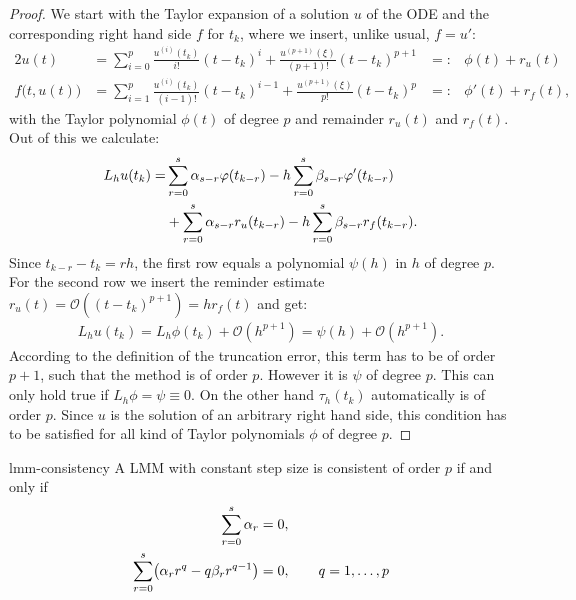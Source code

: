 \begin{proof}
  We start with the Taylor expansion of a solution $u$ of the ODE and
  the corresponding right hand side $f$ for $t_k$, where we insert,
  unlike usual, $f=u'$:
  \begin{alignat*}2
    u(t) &= \sum_{i=0}^p \frac{u^{(i)}(t_k)}{i!}(t-t_k)^i +
    \frac{u^{(p+1)}(\xi)}{(p+1)!}(t-t_k)^{p+1} &=:& \phi(t) + r_u(t)
    \\
    f\bigl(t,u(t)\bigr) &= \sum_{i=1}^p \frac{u^{(i)}(t_k)}{(i-1)!}(t-t_k)^{i-1} +
    \frac{u^{(p+1)}(\xi)}{p!}(t-t_k)^{p} &=:& \phi'(t) + r_f(t),
  \end{alignat*}
  with the Taylor polynomial $\phi(t)$ of degree $p$ and remainder
  $r_u(t)$ and $r_f(t)$. Out of this we calculate:
  \begin{align*}
    L_h u(t_k) =& \sum_{r=0}^s \alpha_{s-r} \varphi(t_{k-r}) - h
    \sum_{r=0}^s \beta_{s-r} \varphi'(t_{k-r})
    \\
    &+ \sum_{r=0}^s \alpha_{s-r} r_u(t_{k-r}) - h
    \sum_{r=0}^s \beta_{s-r} r_f(t_{k-r}).
  \end{align*}
  Since $t_{k-r}-t_k = r h$, the first row equals a polynomial 
  $\psi(h)$ in $h$ of degree $p$. For the second row we insert the
	reminder estimate $r_u(t) = \mathcal O((t-t_k)^{p+1}) = h
  r_f(t)$ and get:
  \begin{gather}
    \label{eq:lmm:15}
    L_h u(t_k) = L_h \phi(t_k) + \mathcal O(h^{p+1}) = \psi(h) + \mathcal O(h^{p+1}).
  \end{gather}
  According to the definition of the truncation error, this term has to be of
	order $p+1$, such that the method is of order $p$. However it is $\psi$
  of degree $p$. This can only hold true if $L_h\phi=\psi\equiv
  0$. On the other hand $\tau_h(t_k)$ automatically is of order
  $p$. Since $u$ is the solution of an arbitrary right hand side, this
	condition has to be satisfied for all kind of Taylor polynomials $\phi$ 
	of degree $p$.
\end{proof}

\begin{Theorem}{lmm-consistency}
  A LMM with constant step size is consistent of order
  $p$ if and only if
    \begin{gather}
      \label{eq:lmm:12}
      \begin{split}
      \sum_{r=0}^s \alpha_{r} &= 0, \\
      \sum_{r=0}^s \bigl(\alpha_{r}r^q - q \beta_{r}
      r^{q-1}\bigr) &= 0,
      \qquad q = 1,\dots,p        
      \end{split}
    \end{gather}
\end{Theorem}



